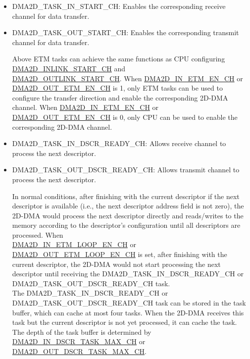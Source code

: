 \documentclass[main\_\_EN.tex]{subfiles}
\begin{document}
\begin{itemize}
    \item DMA2D\_TASK\_IN\_START\_CH: Enables the corresponding receive channel  for data transfer.
    \item DMA2D\_TASK\_OUT\_START\_CH: Enables the corresponding transmit channel  for data transfer.
        \begin{tiplisting}
        Above ETM tasks can achieve the same functions as CPU configuring \hyperref[fielddesc:DMA2DINLINKSTARTCHN]{DMA2D\_INLINK\_START\_CH} and \\\hyperref[fielddesc:DMA2DOUTLINKSTARTCHN]{DMA2D\_OUTLINK\_START\_CH}. When \hyperref[fielddesc:DMA2DINETMENCHN]{DMA2D\_IN\_ETM\_EN\_CH}  or \hyperref[fielddesc:DMA2DOUTETMENCHN]{DMA2D\_OUT\_ETM\_EN\_CH} is 1, only ETM tasks can be used to configure the transfer direction and enable the corresponding 2D-DMA channel. When \hyperref[fielddesc:DMA2DINETMENCHN]{DMA2D\_IN\_ETM\_EN\_CH} or \hyperref[fielddesc:DMA2DOUTETMENCHN]{DMA2D\_OUT\_ETM\_EN\_CH} is 0, only CPU can be used to enable the corresponding 2D-DMA channel.
        \end{tiplisting}
    \item DMA2D\_TASK\_IN\_DSCR\_READY\_CH: Allows receive channel  to process the next descriptor.
    \item DMA2D\_TASK\_OUT\_DSCR\_READY\_CH: Allows transmit channel  to process the next descriptor.
        \begin{tiplisting}
        In normal conditions, after finishing with the current descriptor if the next descriptor is available (i.e., the next descriptor address field is not zero), the 2D-DMA would process the next descriptor directly and reads/writes to the memory according to the descriptor's configuration until all descriptors are processed. When \\\hyperref[fielddesc:DMA2DINETMLOOPENCHN]{DMA2D\_IN\_ETM\_LOOP\_EN\_CH} or \hyperref[fielddesc:DMA2DOUTETMLOOPENCHN]{DMA2D\_OUT\_ETM\_LOOP\_EN\_CH} is set, after finishing with the current descriptor, the 2D-DMA would not start processing the next descriptor until receiving the DMA2D\_TASK\_IN\_DSCR\_READY\_CH or \\DMA2D\_TASK\_OUT\_DSCR\_READY\_CH task.\\
        The DMA2D\_TASK\_IN\_DSCR\_READY\_CH or DMA2D\_TASK\_OUT\_DSCR\_READY\_CH task can be stored in the task buffer, which can cache at most four tasks. When the 2D-DMA receives this task but the current descriptor is not yet processed, it can cache the task. The depth of the task buffer is determined by \\\hyperref[fielddesc:DMA2DINDSCRTASKMAKCHN]{DMA2D\_IN\_DSCR\_TASK\_MAX\_CH} or \hyperref[fielddesc:DMA2DOUTDSCRTASKMAKCHN]{DMA2D\_OUT\_DSCR\_TASK\_MAX\_CH}.\\

\end{tiplisting}
\end{itemize}
\end{document}
